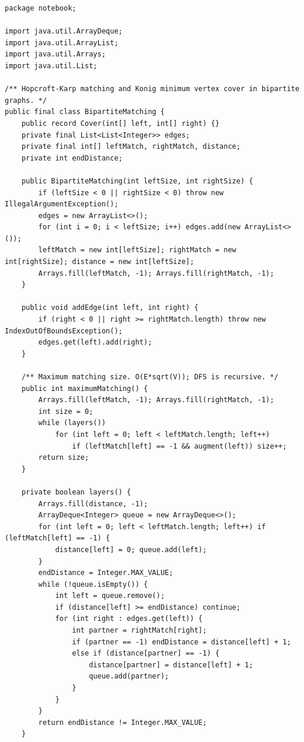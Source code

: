 \documentclass[10pt,letterpaper]{article}
\begin{document}
\begin{lstlisting}
package notebook;

import java.util.ArrayDeque;
import java.util.ArrayList;
import java.util.Arrays;
import java.util.List;

/** Hopcroft-Karp matching and Konig minimum vertex cover in bipartite graphs. */
public final class BipartiteMatching {
    public record Cover(int[] left, int[] right) {}
    private final List<List<Integer>> edges;
    private final int[] leftMatch, rightMatch, distance;
    private int endDistance;

    public BipartiteMatching(int leftSize, int rightSize) {
        if (leftSize < 0 || rightSize < 0) throw new IllegalArgumentException();
        edges = new ArrayList<>();
        for (int i = 0; i < leftSize; i++) edges.add(new ArrayList<>());
        leftMatch = new int[leftSize]; rightMatch = new int[rightSize]; distance = new int[leftSize];
        Arrays.fill(leftMatch, -1); Arrays.fill(rightMatch, -1);
    }

    public void addEdge(int left, int right) {
        if (right < 0 || right >= rightMatch.length) throw new IndexOutOfBoundsException();
        edges.get(left).add(right);
    }

    /** Maximum matching size. O(E*sqrt(V)); DFS is recursive. */
    public int maximumMatching() {
        Arrays.fill(leftMatch, -1); Arrays.fill(rightMatch, -1);
        int size = 0;
        while (layers())
            for (int left = 0; left < leftMatch.length; left++)
                if (leftMatch[left] == -1 && augment(left)) size++;
        return size;
    }

    private boolean layers() {
        Arrays.fill(distance, -1);
        ArrayDeque<Integer> queue = new ArrayDeque<>();
        for (int left = 0; left < leftMatch.length; left++) if (leftMatch[left] == -1) {
            distance[left] = 0; queue.add(left);
        }
        endDistance = Integer.MAX_VALUE;
        while (!queue.isEmpty()) {
            int left = queue.remove();
            if (distance[left] >= endDistance) continue;
            for (int right : edges.get(left)) {
                int partner = rightMatch[right];
                if (partner == -1) endDistance = distance[left] + 1;
                else if (distance[partner] == -1) {
                    distance[partner] = distance[left] + 1;
                    queue.add(partner);
                }
            }
        }
        return endDistance != Integer.MAX_VALUE;
    }


\end{lstlisting}
\end{document}
